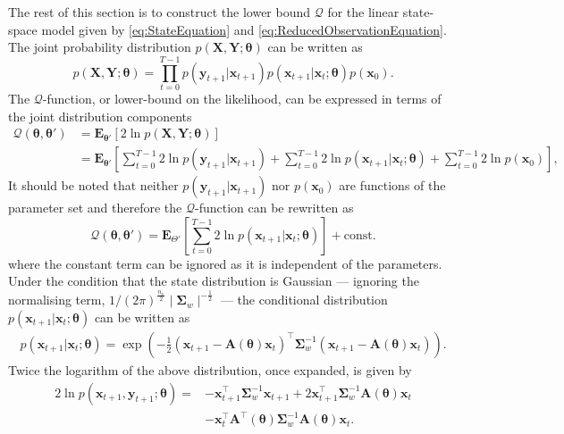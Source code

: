 \documentclass[review,authoryear,3p]{elsarticle}
\begin{document}
 The rest of this section is to construct the lower bound $\mathcal Q$ for the linear state-space model given by \eqref{eq:StateEquation} and \eqref{eq:ReducedObservationEquation}. The joint probability distribution $p(\mathbf X,\mathbf Y;\boldsymbol \theta)$ can be written as
 \begin{equation}\label{eq:jointdistribution}
  p(\mathbf X,\mathbf Y;\boldsymbol \theta)=\prod_{t=0}^{T-1} p(\mathbf y_{t+1}|\mathbf x_{t+1})p(\mathbf x_{t+1}|\mathbf x_{t};\boldsymbol \theta)p(\mathbf x_0).
 \end{equation}
The $\mathcal Q$-function, or lower-bound on the likelihood, can be expressed in terms of the joint distribution components
 \begin{align}
  \mathcal Q(\boldsymbol \theta,\boldsymbol\theta')&=\mathbf E_{\boldsymbol \theta'}\left[2\ln p(\mathbf X,\mathbf Y;\boldsymbol \theta)\right] \nonumber \\
 &=\mathbf E_{\boldsymbol\theta'}\left[\sum_{t=0}^{T-1}2\ln p(\mathbf y_{t+1}|\mathbf x_{t+1})+\sum_{t=0}^{T-1}2\ln p(\mathbf x_{t+1}|\mathbf x_{t};\boldsymbol \theta)
 +\sum_{t=0}^{T-1}2\ln p(\mathbf x_0)\right],
 \end{align}   
It should be noted that neither $p(\mathbf y_{t+1}|\mathbf x_{t+1})$ nor $p(\mathbf x_0)$ are functions of the parameter set and therefore the $\mathcal Q$-function can be rewritten as
\begin{equation}
\mathcal Q(\boldsymbol \theta,\boldsymbol\theta')=\mathbf E_{\Theta'}\left[\sum_{t=0}^{T-1}2\ln p(\mathbf x_{t+1}|\mathbf x_{t};\boldsymbol \theta)\right]+\mathrm{const.}
\end{equation}
where the constant term can be ignored as it is independent of the parameters. Under the condition that the state distribution is Gaussian --- ignoring the normalising term, $1/(2\pi)^{\frac{n_x}{2}}\mid\boldsymbol\Sigma_w\mid^{-\frac{1}{2}}$ --- the conditional distribution $p(\mathbf x_{t+1} | \mathbf x_{t};\boldsymbol\theta)$ can be written as
\begin{align}
p(\mathbf x_{t+1} | \mathbf x_{t};\boldsymbol\theta)=  \exp\left({-\frac{1}{2}\left(\mathbf x_{t+1}-\mathbf A\left(\boldsymbol\theta\right)\mathbf  x_t\right)^\top\boldsymbol\Sigma_w^{-1}\left(\mathbf x_{t+1}-\mathbf A\left(\boldsymbol\theta\right)\mathbf  x_t\right)}\right).
\end{align}
Twice the logarithm of the above distribution, once expanded, is given by
\begin{align}\label{eq:Qfunction}
2\ln p(\mathbf x_{t+1} , \mathbf y_{t+1};\boldsymbol\theta)=&-\mathbf x_{t+1}^\top\boldsymbol\Sigma_w^{-1}\mathbf x_{t+1}+2\mathbf x_{t+1}^\top\boldsymbol\Sigma_w^{-1}\mathbf A( \boldsymbol\theta)\mathbf x_t\nonumber \\
&-\mathbf x_t^\top\mathbf A^\top(\boldsymbol\theta)\boldsymbol\Sigma_w^{-1}\mathbf A(\boldsymbol\theta)\mathbf x_t.
\end{align}
\end{document}
